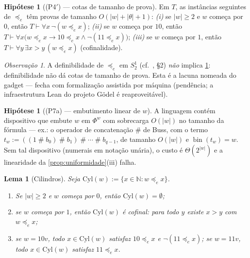\documentclass[11pt,a4paper]{article}
\newtheorem{lemma}[theorem]{Lema}
\theoremstyle{definition}
\newtheorem{hypothesis}[theorem]{Hipótese}
\theoremstyle{remark}
\newtheorem*{remark}{Observação}
\newcommand{\N}{\mathbb{N}}
\begin{document}
\begin{hypothesis}[(P4$'$) --- cotas de tamanho de prova]\label{hyp:P4p}
Em $T$, as instâncias seguintes de $\preceq_{e}$ têm provas de tamanho
$O(\lvert w\rvert + \lvert\theta\rvert + 1)$:
\emph{(i)} se $\lvert w\rvert \geq 2$ e $w$ começa por $0$, então
$T \vdash \forall x\, \neg(w \preceq_{e} x)$;
\emph{(ii)} se $w$ começa por $10$, então
$T \vdash \forall x\bigl(w \preceq_{e} x \rightarrow
10 \preceq_{e} x \wedge \neg(11 \preceq_{e} x)\bigr)$;
\emph{(iii)} se $w$ começa por $1$, então
$T \vdash \forall y\, \exists x > y\, (w \preceq_{e} x)$ (cofinalidade).
\end{hypothesis}

\begin{remark}
A definibilidade de $\preceq_{e}$ em $S^{1}_{2}$ (cf.\ \cite{Krajicek2025},
§2) \emph{não} implica \cref{hyp:P4p}: definibilidade não dá cotas de tamanho
de prova. Esta é a lacuna nomeada do gadget --- fecha com formalização
assistida por máquina (pendência; a infraestrutura Lean do projeto Gödel é
reaproveitável).
\end{remark}

\begin{hypothesis}[(P7a) --- embutimento linear de $w$]\label{hyp:P7a}
A linguagem contém dispositivo que embute $w$ em $\Phi^{w}$ com sobrecarga
$O(\lvert w\rvert)$ no tamanho da fórmula --- ex.: o operador de concatenação
$\#$ de Buss, com o termo
$t_{w} := ((1 \mathbin{\#} b_{0}) \mathbin{\#} b_{1}) \mathbin{\#} \cdots
\mathbin{\#} b_{q-1}$, de tamanho $O(\lvert w\rvert)$ e
$\operatorname{bin}(t_{w}) = w$. Sem tal dispositivo (numerais em notação
unária), o custo é $\Theta(2^{\lvert w\rvert})$ e a linearidade da
\cref{prop:uniformidade}(iii) falha.
\end{hypothesis}

\begin{lemma}[Cilindros]\label{lem:cilindro}
Seja $\mathrm{Cyl}(w) := \{ x \in \N : w \preceq_{e} x \}$.
\begin{enumerate}
\item[\emph{(i)}] Se $\lvert w\rvert \geq 2$ e $w$ começa por $0$, então
  $\mathrm{Cyl}(w) = \emptyset$;
\item[\emph{(ii)}] se $w$ começa por $1$, então $\mathrm{Cyl}(w)$ é cofinal:
  para todo $y$ existe $x > y$ com $w \preceq_{e} x$;
\item[\emph{(iii)}] se $w = 10v$, todo $x \in \mathrm{Cyl}(w)$ satisfaz
  $10 \preceq_{e} x$ e $\neg(11 \preceq_{e} x)$; se $w = 11v$, todo
  $x \in \mathrm{Cyl}(w)$ satisfaz $11 \preceq_{e} x$.
\end{enumerate}
\end{lemma}
\end{document}
